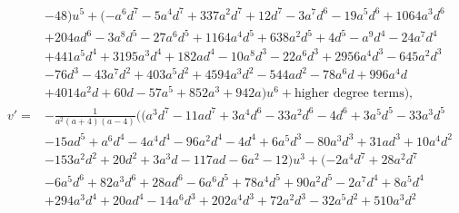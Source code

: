 \documentclass{gtpart}
\theoremstyle{definition}
\theoremstyle{remark}
\begin{document}
\begin{equation*}
\begin{split}
      & - 48) u^5 + (-a^6 d^7 - 5 a^4 d^7 + 337 a^2 d^7 + 12 d^7 - 3 a^7 d^6 - 19 a^5 d^6 + 1064 a^3 d^6 \\
      & + 204 a d^6 - 3 a^8 d^5 - 27 a^6 d^5 + 1164 a^4 d^5 + 638 a^2 d^5 + 4 d^5 - a^9 d^4 - 24 a^7 d^4 \\
      & + 441 a^5 d^4 + 3195 a^3 d^4 + 182 a d^4 - 10 a^8 d^3 - 22 a^6 d^3 + 2956 a^4 d^3 - 645 a^2 d^3 \\
      & - 76 d^3 - 43 a^7 d^2 + 403 a^5 d^2 + 4594 a^3 d^2 - 544 a d^2 - 78 a^6 d + 996 a^4 d \\
      & + 4014 a^2 d + 60 d - 57 a^5 + 852 a^3 + 942 a) u^6 + \text{higher degree terms} \big), \\
 v' = & -\frac{1}{a^2 (a + 4) (a - 4)} \big( (a^3 d^7 - 11 a d^7 + 3 a^4 d^6 - 33 a^2 d^6 - 4 d^6 + 3 a^5 d^5 - 33 a^3 d^5 \\
      & - 15 a d^5 + a^6 d^4 - 4 a^4 d^4 - 96 a^2 d^4 - 4 d^4 + 6 a^5 d^3 - 80 a^3 d^3 + 31 a d^3 + 10 a^4 d^2 \\
      & - 153 a^2 d^2 + 20 d^2 + 3 a^3 d - 117 a d - 6 a^2 - 12) u^3 + (-2 a^4 d^7 + 28 a^2 d^7 \\
      & - 6 a^5 d^6 + 82 a^3 d^6 + 28 a d^6 - 6 a^6 d^5 + 78 a^4 d^5 + 90 a^2 d^5 - 2 a^7 d^4 + 8 a^5 d^4 \\
      & + 294 a^3 d^4 + 20 a d^4 - 14 a^6 d^3 + 202 a^4 d^3 + 72 a^2 d^3 - 32 a^5 d^2 + 510 a^3 d^2 
\end{split}
\end{equation*}
\end{document}
